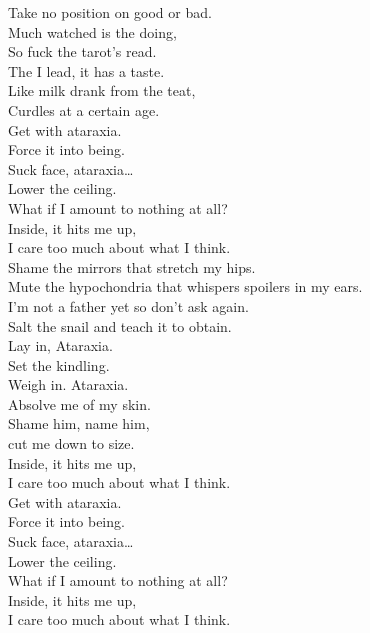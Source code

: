 



Take no position on good or bad. \\
Much watched is the doing, \\
So fuck the tarot's read. \\
The  I lead, it has a taste. \\
Like milk drank from the teat, \\
Curdles at a certain age. \\

Get with ataraxia. \\
Force it into being. \\
Suck face, ataraxia… \\
Lower the ceiling. \\
What if I amount to nothing at all? \\
Inside, it hits me up, \\
I care too much about what I think. \\

Shame the mirrors that stretch my hips. \\
Mute the hypochondria that whispers spoilers in my ears. \\
I'm not a father yet so don't ask again. \\
Salt the snail and teach it to obtain. \\

Lay in, Ataraxia. \\
Set the kindling. \\
Weigh in. Ataraxia. \\
Absolve me of my skin. \\
Shame him, name him, \\
cut me down to size. \\
Inside, it hits me up, \\
I care too much about what I think. \\

Get with ataraxia. \\
Force it into being. \\
Suck face, ataraxia… \\
Lower the ceiling. \\
What if I amount to nothing at all? \\
Inside, it hits me up, \\
I care too much about what I think. \\

